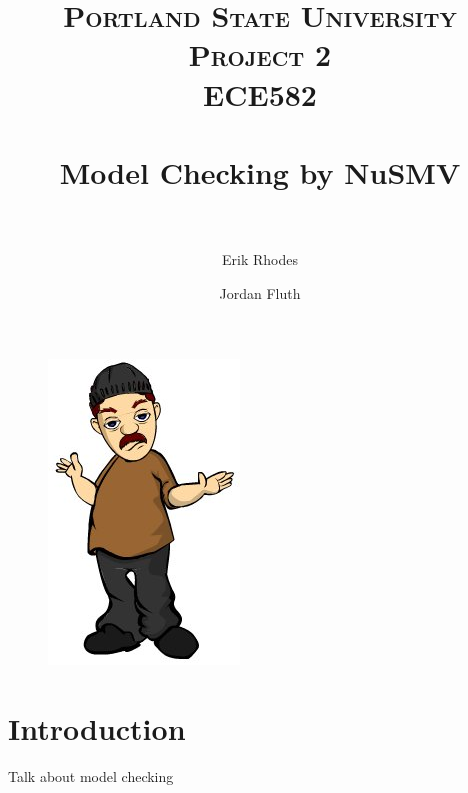 \documentclass[11pt]{article}
\title{	
\normalfont \normalsize 
\textsc{\LARGE Portland State University}\\[1.5cm] %
\textsc{\Large Project 2}\\[0.5cm] %
\textsc{\large ECE582}\\[0.5cm] %
\horrule{1.2pt} \\[0.4cm] %
\huge Model Checking by NuSMV \\ %
\horrule{1.2pt} \\[0.5cm] %
}
\begin{document}
\raggedright
\author{Erik Rhodes \and Jordan Fluth} %
\maketitle %
\thispagestyle{empty}


\begin{figure}[h]\centering
\includegraphics[height=0.65\textwidth]{images/sat_intro.jpg}
		\label{LED}
	\end{figure}
	
\newpage

%
%



\section{Introduction} 
Talk about model checking


\end{document}
